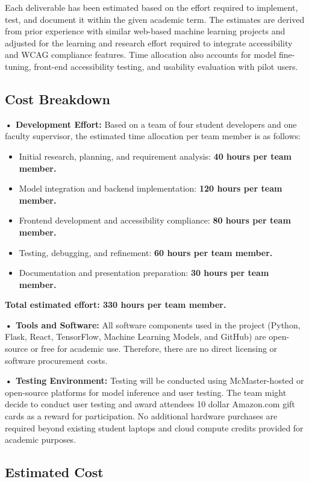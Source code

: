 \documentclass[12pt]{article}
\begin{document}
Each deliverable has been estimated based on the effort required to implement, test, and document it within the given academic term.  
The estimates are derived from prior experience with similar web-based machine learning projects and adjusted for the learning and research effort required to integrate accessibility and WCAG compliance features.  
Time allocation also accounts for model fine-tuning, front-end accessibility testing, and usability evaluation with pilot users.

\subsection{Cost Breakdown}

\noindent\textbf{• Development Effort:} Based on a team of four student developers and one faculty supervisor, the estimated time allocation per team member is as follows:
\begin{itemize}
    \item Initial research, planning, and requirement analysis: \textbf{40 hours per team member.}
    \item Model integration and backend implementation: \textbf{120 hours per team member.}
    \item Frontend development and accessibility compliance: \textbf{80 hours per team member.}
    \item Testing, debugging, and refinement: \textbf{60 hours per team member.}
    \item Documentation and presentation preparation: \textbf{30 hours per team member.}
\end{itemize}
\noindent\textbf{Total estimated effort: 330 hours per team member.}

\noindent\textbf{• Tools and Software:}  
All software components used in the project (Python, Flask, React, TensorFlow, Machine Learning Models, and GitHub) are open-source or free for academic use.  
Therefore, there are no direct licensing or software procurement costs.

\noindent\textbf{• Testing Environment:}  
Testing will be conducted using McMaster-hosted or open-source platforms for model inference and user testing.
The team might decide to conduct user testing and award attendees 10 dollar Amazon.com gift cards as a reward for participation.  
No additional hardware purchases are required beyond existing student laptops and cloud compute credits provided for academic purposes.

\subsection{Estimated Cost}
\end{document}
